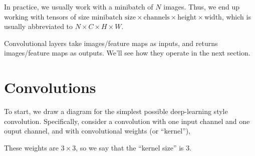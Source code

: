 \documentclass{article}
\begin{document}
In practice, we usually work with a minibatch of $N$ images. 
Thus, we end up working with tensors of size $\text{minibatch size} \times \text{channels} \times \text{height} \times \text{width}$, which is usually abbreviated to $N \times C\times H \times W$.

Convolutional layers take images/feature maps as inputs, and returns images/feature maps as outputs.
We'll see how they operate in the next section.


\clearpage
\FloatBarrier
\section{Convolutions}

To start, we draw a diagram for the simplest possible deep-learning style convolution.
Specifically, consider a convolution with one input channel and one ouput channel, and with convolutional weights (or ``kernel''),
\begin{figure}[H]
    \centering
\end{figure}
These weights are $3 \times 3$, so we say that the ``kernel size'' is 3.
\end{document}
